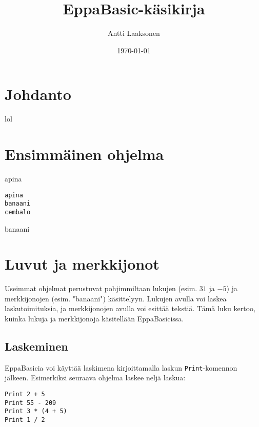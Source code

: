 \documentclass[oneside,11pt,a4paper,finnish]{book}
\date{\Large \today}
\title{\Huge EppaBasic-käsikirja}
\author{\Large Antti Laaksonen}
\begin{document}

\setcounter{page}{1}

\frontmatter
\maketitle
\setcounter{tocdepth}{0}
\tableofcontents

\setcounter{page}{1}
\mainmatter

\newcommand{\kuva}[1] {
\begin{center}
\texttt{[image: \#1.png]}
\end{center}
}

\chapter*{Johdanto}
lol


\chapter{Ensimmäinen ohjelma}

apina


\begin{verbatim}
apina
banaani
cembalo
\end{verbatim}

banaani

\chapter{Luvut ja merkkijonot}

Useimmat ohjelmat perustuvat pohjimmiltaan
lukujen (esim. $31$ ja $-5$) ja merkkijonojen (esim. "banaani") käsittelyyn.
Lukujen avulla voi laskea laskutoimituksia,
ja merkkijonojen avulla voi esittää tekstiä.
Tämä luku kertoo, kuinka lukuja ja merkkijonoja
käsitellään EppaBasicissa.

\section{Laskeminen}

EppaBasicia voi käyttää laskimena kirjoittamalla laskun
\texttt{Print}-komennon jälkeen.
Esimerkiksi seuraava ohjelma laskee neljä laskua:

\begin{verbatim}
Print 2 + 5
Print 55 - 209
Print 3 * (4 + 5)
Print 1 / 2
\end{verbatim}
\end{document}
